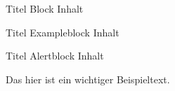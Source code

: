 \documentclass{beamer}
\begin{document}
	
	\begin{frame}
		
	\begin{block}{Titel Block}
		Inhalt
	\end{block}
	
	\begin{exampleblock}{Titel Exampleblock}
		Inhalt
	\end{exampleblock}

	\begin{alertblock}{Titel Alertblock}
		Inhalt
	\end{alertblock}
	\end{frame}

Das hier ist ein \alert{wichtiger} Beispieltext.	
	
	
\end{document}
